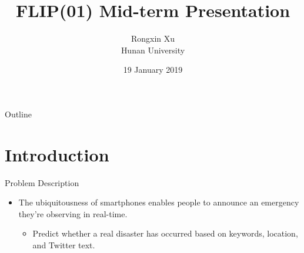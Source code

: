 \documentclass[
 size=12pt,
 paper=smartboard, %
 mode=present, %
 display=slides, %
 style=tuliplab,  %
 pauseslide,
 fleqn,leqno,clock]{powerdot}
\title{FLIP(01) Mid-term Presentation}
\author{Rongxin Xu\\
Hunan University
}
\date{19 January 2019}
\begin{document}
\maketitle

\begin{slide}[toc=,bm=]{Outline}
  \tableofcontents[content=sections]
\end{slide}

\section{Introduction}

\begin{slide}{Problem Description}
  \begin{itemize}
    \item
		The ubiquitousness of smartphones enables 
		people to announce an emergency they’re 
		observing in real-time. 
          \begin{itemize}
            \item
				Predict whether a real disaster has occurred 
				based on keywords, location, and Twitter text.
          \end{itemize}
  \end{itemize}
\end{slide}
\end{document}
